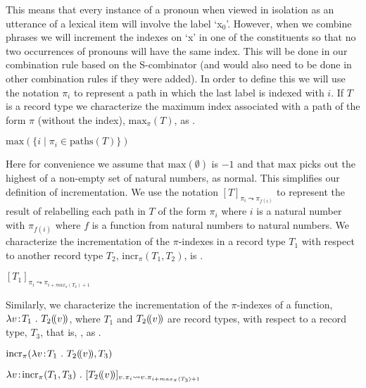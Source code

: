 This means that every instance of a pronoun when viewed in isolation
as an utterance of a lexical item will involve the label `x$_0$'.
However, when we combine phrases we will increment the indexes on `x'
in one of the constituents so that no two occurrences of pronouns will
have the same index.  This will be done in our combination rule based
on the S-combinator (and would also need to be done in other
combination rules if they were added).  In order to define this we
will use the notation $\pi_i$ to represent a path in which the last
label is indexed with $i$.  If $T$ is a record type we characterize
the maximum index associated with a path of the form $\pi$ (without
the index), $\mathrm{max}_\pi(T)$, as \nexteg{}.
\begin{ex} 
$\mathrm{max}(\{i\mid\pi_i\in\mathrm{paths}(T)\})$ 
\end{ex}
Here for convenience we assume that $\mathrm{max}(\emptyset)$ is $-1$
and that $\mathrm{max}$ picks out the highest of a non-empty set of
natural numbers, as normal.  This simplifies our definition of incrementation.
We use the notation $[T]_{\pi_i\leadsto\pi_{f(i)}}$ to represent the
result of relabelling each path in $T$ of the form $\pi_i$ where $i$
is a natural number with $\pi_{f(i)}$ where $f$ is a function from
natural numbers to natural numbers.  We characterize the incrementation of the $\pi$-indexes in a record
type $T_1$ with respect to another record type $T_2$,
$\mathrm{incr}_\pi(T_1,T_2)$, is \nexteg{}.
\begin{ex} 
$[T_1]_{\pi_i\leadsto\pi_{i+max_\pi(T_2)+1}}$
\end{ex}
Similarly, we characterize the incrementation of the $\pi$-indexes of a function, $\lambda
v\!:\!T_1\ .\ T_2(\!(v)\!)$, where $T_1$ and $T_2(\!(v)\!)$ are record
types, with respect to a record type, $T_3$, that is, ,
as .
\begin{ex}
  \begin{subex}
    \item $\mathrm{incr}_\pi(\lambda
v\!:\!T_1\ .\ T_2(\!(v)\!), T_3)$
\item $\lambda v\!:\!\mathrm{incr}_\pi(T_1,T_3)\ .\
  [T_2\dep{v}]_{v.\pi_i\leadsto v.\pi_{i+max_{\pi}(T_3)+1}}$
\end{subex}

\end{ex} 
  

